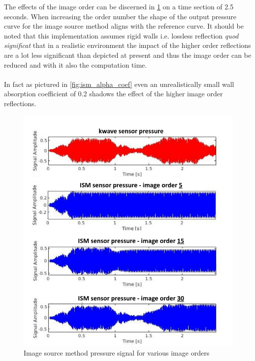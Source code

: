 The effects of the image order can be discerned in \ref{fig:ism_image_order} on a time section of 2.5 seconds. When increasing the order number the shape of the output pressure curve for the image source method aligns with the reference curve. It should be noted that this implementation assumes rigid walls i.e. lossless reflection \textit{quod significat} that in a realistic environment the impact of the higher order reflections are a lot less significant than depicted at present and thus the image order can be reduced and with it also the computation time.\\
\\
In fact as pictured in \ref{fig:ism_alpha_coef} even an unrealistically small wall absorption coefficient of 0.2 shadows the effect of the higher image order reflections.
\begin{figure}
    \centerline{\includegraphics[width=1.3\textwidth,keepaspectratio]{LaTeX/images/plots/matlab_image_order_impact.png}}
    \caption{Image source method pressure signal for various image orders}
    \label{fig:ism_image_order}
\end{figure}
